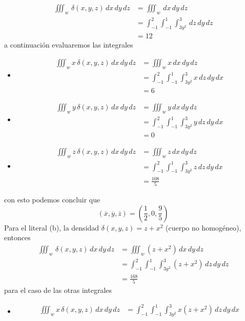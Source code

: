 \documentclass[a4,11pt]{aleph-examen}
\begin{document}
\begin{preguntas}
\begin{respuesta}
\begin{respuesta}
\begin{respuesta}
\begin{enumerate}
\begin{respuesta}
	\begin{align*}
	    \iiint_w\,\delta(x,y,z)\,dx\,dy\,dz &= \iiint_w\,dx\,dy\,dz\\
	    &=\int_{-1}^2\int_{-1}^1\int_{3y^2}^3\,dz\,dy\,dz\\
	    &=12
	\end{align*}
	a continuación evaluaremos las integrales 
	\begin{itemize}
	    \item [i)]
        \begin{align*}
    	    \iiint_w x\,\delta(x,y,z)\,dx\,dy\,dz &= \iiint_w x\,dx\,dy\,dz\\
    	    &=\int_{-1}^2\int_{-1}^1\int_{3y^2}^3x\,dz\,dy\,dx\\
    	    &=6
    	\end{align*}
    	\item [ii)]
        \begin{align*}
    	    \iiint_w y\,\delta(x,y,z)\,dx\,dy\,dz &= \iiint_w y\,dx\,dy\,dz\\
    	    &=\int_{-1}^2\int_{-1}^1\int_{3y^2}^3 y\,dz\,dy\,dx\\
    	    &=0
    	\end{align*}
    	\item [iii)]
        \begin{align*}
    	    \iiint_w z\,\delta(x,y,z)\,dx\,dy\,dz &= \iiint_w z\,dx\,dy\,dz\\
    	    &=\int_{-1}^2\int_{-1}^1\int_{3y^2}^3 z\,dz\,dy\,dx\\
    	    &=\frac{108}{5}
    	\end{align*}
    \end{itemize}
	con esto podemos concluir que
	\[
	(\overline{x}, \overline{y}, \overline{z})=\left(\frac{1}{2}, 0, \frac{9}{5}\right)
	        \]
    Para el literal (b), la densidad $\delta(x,y,z)=z+x^2$ (cuerpo no homogéneo), entonces	 
    	\begin{align*}
	    \iiint_w\,\delta(x,y,z)\,dx\,dy\,dz &= \iiint_w(z+x^2)\,dx\,dy\,dz\\
	    &=\int_{-1}^2\int_{-1}^1\int_{3y^2}^3 (z+x^2)\,dz\,dy\,dz\\
	    &=\frac{168}{5}
	\end{align*}
	para el caso de las otras integrales  
	\begin{itemize}
	    \item [i)]
        \begin{align*}
    	    \iiint_w x\,\delta(x,y,z)\,dx\,dy\,dz &=\int_{-1}^2\int_{-1}^1\int_{3y^2}^3x(z+x^2)\,dz\,dy\,dx\\

\end{align*}
\end{itemize}
\end{respuesta}
\end{enumerate}
\end{respuesta}
\end{respuesta}
\end{respuesta}
\end{preguntas}
\end{document}
